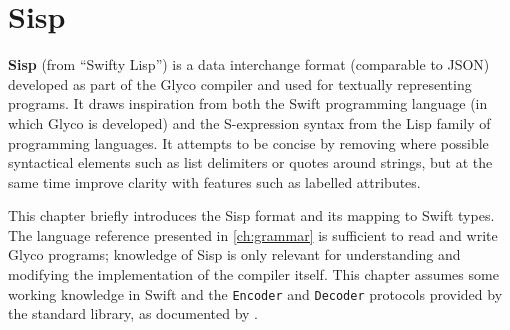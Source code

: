 \documentclass[main.tex]{subfiles}
\begin{document}
\onlyinsubfile{\mainmatter{}\appendix{}}

\chapter{Sisp} \label{ch:sisp}
\textbf{Sisp} (from \enquote{Swifty Lisp}) is a data interchange format (comparable to JSON) developed as part of the Glyco compiler and used for textually representing programs. It draws inspiration from both the Swift programming language (in which Glyco is developed) and the S-expression syntax from the Lisp family of programming languages. It attempts to be concise by removing where possible syntactical elements such as list delimiters or quotes around strings, but at the same time improve clarity with features such as labelled attributes.

This chapter briefly introduces the Sisp format and its mapping to Swift types. The language reference presented in \cref{ch:grammar} is sufficient to read and write Glyco programs; knowledge of Sisp is only relevant for understanding and modifying the implementation of the compiler itself. This chapter assumes some working knowledge in Swift and the \texttt{Encoder} and \texttt{Decoder} protocols provided by the standard library, as documented by \citet{swiftcoding}.
\end{document}
